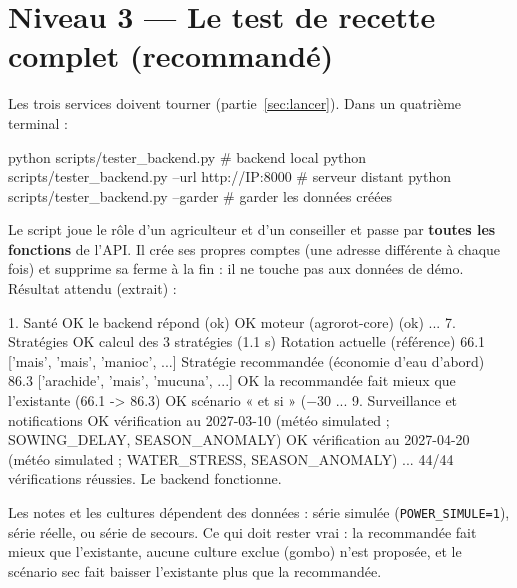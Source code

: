 \documentclass[11pt,a4paper]{article}
\begin{document}
\section{Niveau 3 — Le test de recette complet (recommandé)}\label{sec:recette}

Les trois services doivent tourner (partie~\ref{sec:lancer}). Dans un quatrième terminal :

\begin{code}
python scripts/tester_backend.py                         # backend local
python scripts/tester_backend.py --url http://IP:8000    # serveur distant
python scripts/tester_backend.py --garder                # garder les données créées
\end{code}

Le script joue le rôle d'un agriculteur et d'un conseiller et passe par \textbf{toutes les fonctions} de l'API. Il
crée ses propres comptes (une adresse différente à chaque fois) et supprime sa ferme à la fin : il ne touche pas
aux données de démo. Résultat attendu (extrait) :

\begin{code}
1. Santé
  OK     le backend répond  (ok)
  OK     moteur (agrorot-core)  (ok)
...
7. Stratégies
  OK     calcul des 3 stratégies  (1.1 s)
         Rotation actuelle (référence)                 66.1  ['mais', 'mais', 'manioc', ...]
         Stratégie recommandée (économie d'eau d'abord) 86.3  ['arachide', 'mais', 'mucuna', ...]
  OK     la recommandée fait mieux que l'existante  (66.1 -> 86.3)
  OK     scénario « et si » (−30 %
...
9. Surveillance et notifications
  OK     vérification au 2027-03-10  (météo simulated ; SOWING_DELAY, SEASON_ANOMALY)
  OK     vérification au 2027-04-20  (météo simulated ; WATER_STRESS, SEASON_ANOMALY)
...
44/44 vérifications réussies.
Le backend fonctionne.
\end{code}

\begin{attention}
Les notes et les cultures dépendent des données : série simulée (\texttt{POWER\_SIMULE=1}), série réelle, ou série
de secours. Ce qui doit rester vrai : la recommandée fait mieux que l'existante, aucune culture exclue (gombo)
n'est proposée, et le scénario sec fait baisser l'existante plus que la recommandée.
\end{attention}
\end{document}

